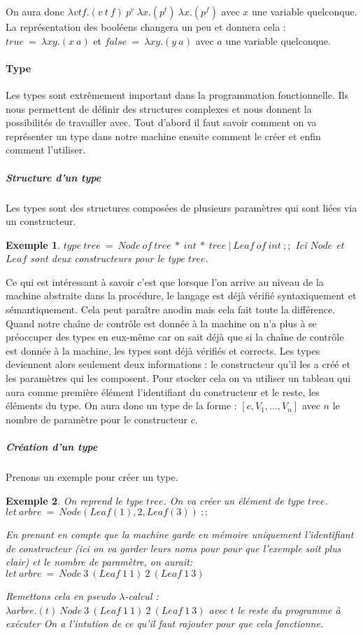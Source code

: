 \documentclass[10pt,a4paper]{report}
\newtheorem{ex}{Exemple}
\begin{document}
	On aura donc $\lambda vtf.(v~t~f)~p^{v}~\lambda x.(p^{t})~\lambda x.(p^{f})$ avec $x$ une variable quelconque. La représentation des booléens changera un peu et donnera cela : $true~=~\lambda xy.(x~a)$ et $false~=~\lambda xy.(y~a)$ avec $a$ une variable quelconque.
	\newpage
	
	
	\paragraph{Type } Les types sont extrêmement important dans la programmation fonctionnelle. Ils nous permettent de définir des structures complexes et nous donnent la possibilités de travailler avec. Tout d'abord il faut savoir comment on va représenter un type dans notre machine ensuite comment le créer et enfin comment l'utiliser.
	
		\subparagraph{Structure d'un type} Les types sont des structures composées de plusieurs paramètres qui sont liées via un constructeur.
		
		\begin{ex}
			$type~tree~=~Node~of~tree~*~int~*~tree~|~Leaf~of~int~;;$
			\smallbreak
			Ici $Node$ et $Leaf$ sont deux constructeurs pour le type $tree$.
		\end{ex}
	
	Ce qui est intéressant à savoir c'est que lorsque l'on arrive au niveau de la machine abstraite dans la procédure, le langage est déjà vérifié syntaxiquement et sémantiquement. Cela peut paraître anodin mais cela fait toute la différence. Quand notre chaîne de contrôle est donnée à la machine on n'a plus à se préoccuper des types en eux-même car on sait déjà que si la chaîne de contrôle est donnée à la machine, les types sont déjà vérifiés et corrects. Les types deviennent alors seulement deux informations : le constructeur qu'il les a créé et les paramètres qui les composent. Pour stocker cela on va utiliser un tableau qui aura comme première élément l'identifiant du constructeur et le reste, les éléments du type. On aura donc un type de la forme : $[c,V_{1},...,V_{n}]$ avec $n$ le nombre de paramètre pour le constructeur $c$.
		
		\subparagraph{Création d'un type } Prenons un exemple pour créer un type.
		
		\begin{ex}
			On reprend le type $tree$. On va créer un élément de type $tree$.
			\smallbreak
			$let~arbre~=~Node(Leaf(1),2,Leaf(3))~;;$
			\medbreak
			
			En prenant en compte que la machine garde en mémoire uniquement l'identifiant de constructeur (ici on va garder leurs noms pour pour que l'exemple soit plus clair) et le nombre de paramètre, on aurait:
			\smallbreak
			$let~arbre~=~Node~3~(Leaf~1~1)~2~(Leaf~1~3)$
			\medbreak 
			
			Remettons cela en pseudo $\lambda$-calcul :
			\smallbreak
			$\lambda arbre.(t)~Node~3~(Leaf~1~1)~2~(Leaf~1~3)$ avec $t$ le reste du programme à exécuter
			\smallbreak
			On a l'intution de ce qu'il faut rajouter pour que cela fonctionne.
		\end{ex}
	
\end{document}
